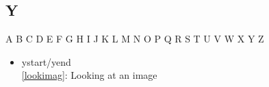 \documentclass[11pt,twoside]{article}
\newcommand{\htmlref}[2]{#1}
\newcommand{\idxint}[2]{\ref{#1}: \htmlref{#2}{#1}}
\newcommand{\idxint}[2]{\htmlref{#2}{#1}}
\begin{document}
\subsection*{\label{index_Y}Y}

\begin{htmlonly}
\htmlref{A}{index_A}
\htmlref{B}{index_B}
\htmlref{C}{index_C}
\htmlref{D}{index_D}
\htmlref{E}{index_E}
\htmlref{F}{index_F}
\htmlref{G}{index_G}
\htmlref{H}{index_H}
\htmlref{I}{index_I}
\htmlref{J}{index_J}
\htmlref{K}{index_K}
\htmlref{L}{index_L}
\htmlref{M}{index_M}
\htmlref{N}{index_N}
\htmlref{O}{index_O}
\htmlref{P}{index_P}
\htmlref{Q}{index_Q}
\htmlref{R}{index_R}
\htmlref{S}{index_S}
\htmlref{T}{index_T}
\htmlref{U}{index_U}
\htmlref{V}{index_V}
\htmlref{W}{index_W}
\htmlref{X}{index_X}
Y
Z
\end{htmlonly}

\begin{itemize}
\item ystart/yend\\
   \idxint{lookimag}{Looking at an image}
\end{itemize}

\normalsize\fussy\onecolumn


\begin{htmlonly}

\end{htmlonly}

\typeout{  }
\typeout{*****************************************************}
\typeout{  }
\typeout{  }
\typeout{*****************************************************}
\typeout{  }
\end{document}
